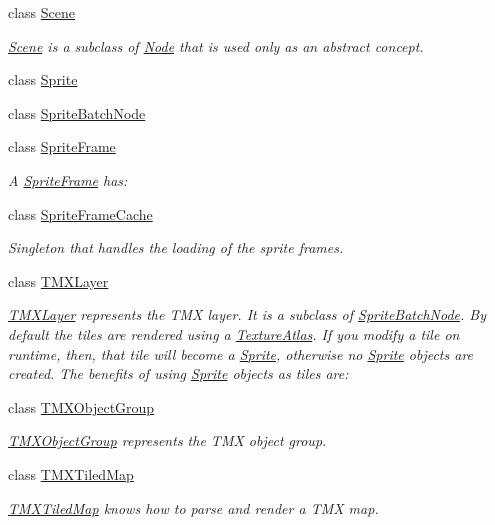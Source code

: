 \begin{DoxyCompactItemize}
class \hyperlink{classScene}{Scene}
\begin{DoxyCompactList}\small\item\em \hyperlink{classScene}{Scene} is a subclass of \hyperlink{classNode}{Node} that is used only as an abstract concept. \end{DoxyCompactList}\item 
class \hyperlink{classSprite}{Sprite}
\item 
class \hyperlink{classSpriteBatchNode}{Sprite\+Batch\+Node}
\item 
class \hyperlink{classSpriteFrame}{Sprite\+Frame}
\begin{DoxyCompactList}\small\item\em A \hyperlink{classSpriteFrame}{Sprite\+Frame} has\+: \end{DoxyCompactList}\item 
class \hyperlink{classSpriteFrameCache}{Sprite\+Frame\+Cache}
\begin{DoxyCompactList}\small\item\em Singleton that handles the loading of the sprite frames. \end{DoxyCompactList}\item 
class \hyperlink{classTMXLayer}{T\+M\+X\+Layer}
\begin{DoxyCompactList}\small\item\em \hyperlink{classTMXLayer}{T\+M\+X\+Layer} represents the T\+MX layer. It is a subclass of \hyperlink{classSpriteBatchNode}{Sprite\+Batch\+Node}. By default the tiles are rendered using a \hyperlink{classTextureAtlas}{Texture\+Atlas}. If you modify a tile on runtime, then, that tile will become a \hyperlink{classSprite}{Sprite}, otherwise no \hyperlink{classSprite}{Sprite} objects are created. The benefits of using \hyperlink{classSprite}{Sprite} objects as tiles are\+: \end{DoxyCompactList}\item 
class \hyperlink{classTMXObjectGroup}{T\+M\+X\+Object\+Group}
\begin{DoxyCompactList}\small\item\em \hyperlink{classTMXObjectGroup}{T\+M\+X\+Object\+Group} represents the T\+MX object group. \end{DoxyCompactList}\item 
class \hyperlink{classTMXTiledMap}{T\+M\+X\+Tiled\+Map}
\begin{DoxyCompactList}\small\item\em \hyperlink{classTMXTiledMap}{T\+M\+X\+Tiled\+Map} knows how to parse and render a T\+MX map. \end{DoxyCompactList}\item 

\end{DoxyCompactItemize}
